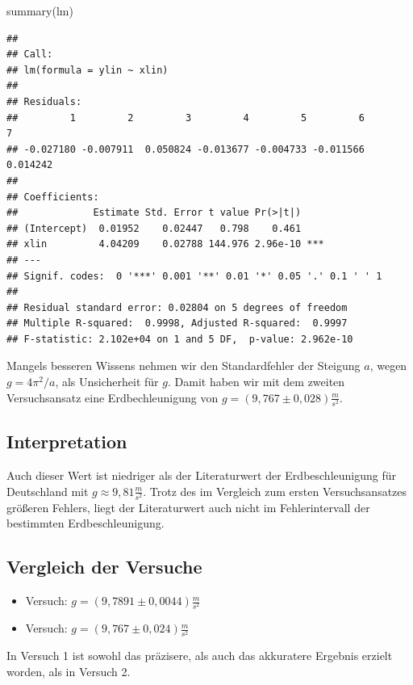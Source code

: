 \documentclass[
  9pt,
]{article}
\newenvironment{Shaded}{\begin{snugshade}}{\end{snugshade}}
\newcommand{\FunctionTok}[1]{\textcolor[rgb]{0.00,0.00,0.00}{#1}}
\newcommand{\NormalTok}[1]{#1}
\begin{document}
\begin{Shaded}
\begin{Highlighting}[]
\FunctionTok{summary}\NormalTok{(lm)}
\end{Highlighting}
\end{Shaded}

\begin{verbatim}
## 
## Call:
## lm(formula = ylin ~ xlin)
## 
## Residuals:
##         1         2         3         4         5         6         7 
## -0.027180 -0.007911  0.050824 -0.013677 -0.004733 -0.011566  0.014242 
## 
## Coefficients:
##             Estimate Std. Error t value Pr(>|t|)    
## (Intercept)  0.01952    0.02447   0.798    0.461    
## xlin         4.04209    0.02788 144.976 2.96e-10 ***
## ---
## Signif. codes:  0 '***' 0.001 '**' 0.01 '*' 0.05 '.' 0.1 ' ' 1
## 
## Residual standard error: 0.02804 on 5 degrees of freedom
## Multiple R-squared:  0.9998, Adjusted R-squared:  0.9997 
## F-statistic: 2.102e+04 on 1 and 5 DF,  p-value: 2.962e-10
\end{verbatim}

Mangels besseren Wissens nehmen wir den Standardfehler der Steigung
\(a\), wegen \(g=4\pi^2/a\), als Unsicherheit für \(g\). Damit haben wir
mit dem zweiten Versuchsansatz eine Erdbechleunigung von
\(g=(9,767 \pm 0,028)\frac{m}{s^2}\).

\hypertarget{interpretation-1}{%
\subsection{Interpretation}\label{interpretation-1}}

Auch dieser Wert ist niedriger als der Literaturwert der
Erdbeschleunigung für Deutschland mit \(g\approx 9,81 \frac{m}{s^2}\).
Trotz des im Vergleich zum ersten Versuchsansatzes größeren Fehlers,
liegt der Literaturwert auch nicht im Fehlerintervall der bestimmten
Erdbeschleunigung.

\hypertarget{vergleich-der-versuche}{%
\subsection{Vergleich der Versuche}\label{vergleich-der-versuche}}

\begin{itemize} 
  \item Versuch: $g=(9,7891 \pm 0,0044)\frac{m}{s^2}$
  \item Versuch: $g=(9,767 \pm 0,024)\frac{m}{s^2}$
\end{itemize}

In Versuch 1 ist sowohl das präzisere, als auch das akkuratere Ergebnis
erzielt worden, als in Versuch 2.
\end{document}
